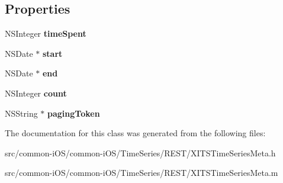 \subsection*{Properties}
\begin{DoxyCompactItemize}
\item 
\hypertarget{interface_x_i_t_s_time_series_meta_ac9c6b9feda4e09a9d4a5fea19535f2b4}{}\label{interface_x_i_t_s_time_series_meta_ac9c6b9feda4e09a9d4a5fea19535f2b4} 
N\+S\+Integer {\bfseries time\+Spent}
\item 
\hypertarget{interface_x_i_t_s_time_series_meta_a847dfc317480a0e61fc3ebcad0da4deb}{}\label{interface_x_i_t_s_time_series_meta_a847dfc317480a0e61fc3ebcad0da4deb} 
N\+S\+Date $\ast$ {\bfseries start}
\item 
\hypertarget{interface_x_i_t_s_time_series_meta_aa6fc3855481cf89a21aa6fe67acba543}{}\label{interface_x_i_t_s_time_series_meta_aa6fc3855481cf89a21aa6fe67acba543} 
N\+S\+Date $\ast$ {\bfseries end}
\item 
\hypertarget{interface_x_i_t_s_time_series_meta_a708d31131798b4fbb94e8672e5583f0f}{}\label{interface_x_i_t_s_time_series_meta_a708d31131798b4fbb94e8672e5583f0f} 
N\+S\+Integer {\bfseries count}
\item 
\hypertarget{interface_x_i_t_s_time_series_meta_a286d58eb9f76c51eed3a1fa00ed1b5a7}{}\label{interface_x_i_t_s_time_series_meta_a286d58eb9f76c51eed3a1fa00ed1b5a7} 
N\+S\+String $\ast$ {\bfseries paging\+Token}
\end{DoxyCompactItemize}


The documentation for this class was generated from the following files\+:\begin{DoxyCompactItemize}
\item 
src/common-\/i\+O\+S/common-\/i\+O\+S/\+Time\+Series/\+R\+E\+S\+T/X\+I\+T\+S\+Time\+Series\+Meta.\+h\item 
src/common-\/i\+O\+S/common-\/i\+O\+S/\+Time\+Series/\+R\+E\+S\+T/X\+I\+T\+S\+Time\+Series\+Meta.\+m\end{DoxyCompactItemize}
